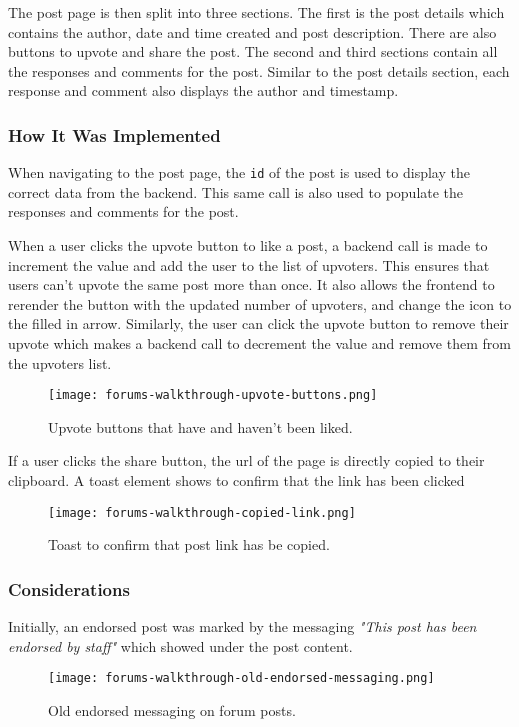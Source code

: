 The post page is then split into three sections.
The first is the post details which contains the author, date and time created and post description.
There are also buttons to upvote and share the post.
The second and third sections contain all the responses and comments for the post.
Similar to the post details section, each response and comment also displays the author and timestamp.

\subsubsection{How It Was Implemented}
When navigating to the post page, the \texttt{id} of the post is used to display the correct data from the backend.
This same call is also used to populate the responses and comments for the post.

When a user clicks the upvote button to like a post, a backend call is made to increment the value and add the user to the list of upvoters.
This ensures that users can't upvote the same post more than once.
It also allows the frontend to rerender the button with the updated number of upvoters, and change the icon to the filled in arrow.
Similarly, the user can click the upvote button to remove their upvote which makes a backend call to decrement the value and remove them from the upvoters list.

\begin{figure}[h!]
    \texttt{[image: forums-walkthrough-upvote-buttons.png]}
    \centering
    \caption{Upvote buttons that have and haven't been liked.}
\end{figure}

If a user clicks the share button, the url of the page is directly copied to their clipboard.
A toast element shows to confirm that the link has been clicked

\begin{figure}[h!]
    \texttt{[image: forums-walkthrough-copied-link.png]}
    \centering
    \caption{Toast to confirm that post link has be copied.}
\end{figure}

\subsubsection{Considerations}
Initially, an endorsed post was marked by the messaging \textit{"This post has been endorsed by staff"} which showed under the post content.

\begin{figure}[h!]
    \texttt{[image: forums-walkthrough-old-endorsed-messaging.png]}
    \centering
    \caption{Old endorsed messaging on forum posts.}
\end{figure}

